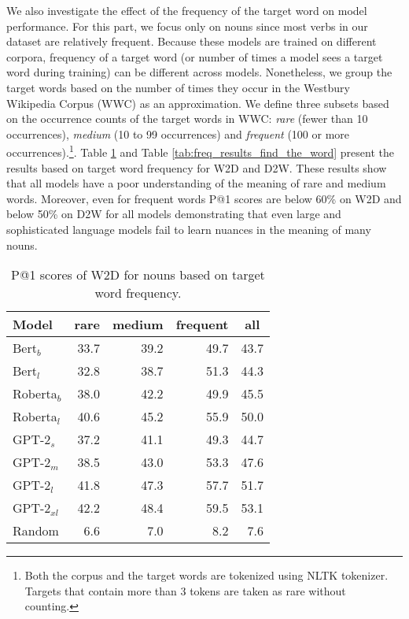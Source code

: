 \documentclass[11pt,a4paper]{article}
\begin{document}
We also investigate the effect of the frequency of the
target word on model performance. For this part, we
focus only on  nouns since most  verbs in our dataset
are relatively frequent. Because these models are trained on
different corpora, frequency of a target word (or number of
times a model sees a target word during training) can be
different across  models. Nonetheless, we group the
target words based on the number of times they occur in the
Westbury Wikipedia Corpus (WWC) \cite{WWC} as an
approximation. We
define three subsets based on the occurrence counts of the
target words in WWC: \textit{rare} (fewer than 10 occurrences),
 \textit{medium} (10 to 99 occurrences) and
 \textit{frequent}
(100 or more occurrences).\footnote{Both the corpus and
  the target words are tokenized using NLTK tokenizer.  Targets
  that contain more than 3 tokens are taken as rare without
  counting.}. Table
\ref{tab:freq_results_find_the_definition} and Table
\ref{tab:freq_results_find_the_word} present the  results
based on target word frequency for
W2D and D2W.
These results show that
all models have a poor understanding of the meaning of 
rare and medium words. Moreover, even for 
frequent words P@1 scores are below 60\% on W2D and below 50\% on D2W for all models demonstrating that even  large and sophisticated language
models fail to learn nuances in the meaning of many
nouns.

\begin{table}
    \centering
    \begin{tabular}{l|rrrr}
    \hline
         \textbf{Model} & \multicolumn{1}{c}{\textbf{rare}} & \multicolumn{1}{c}{\textbf{medium}} & \multicolumn{1}{c}{\textbf{frequent}} & \multicolumn{1}{c}{\textbf{all}} \\ \hline
     Bert$_{b}$ & 33.7 & 39.2 & 49.7 & 43.7 \\
     Bert$_{l}$ & 32.8 & 38.7 & 51.3 & 44.3 \\
     Roberta$_{b}$ & 38.0 & 42.2 & 49.9 & 45.5 \\
     Roberta$_{l}$ & 40.6 & 45.2 & 55.9 & 50.0 \\ \hline
     GPT-2$_{s}$ & 37.2 & 41.1 & 49.3 & 44.7 \\
     GPT-2$_{m}$ & 38.5 & 43.0 & 53.3 & 47.6 \\
     GPT-2$_{l}$ & 41.8 & 47.3 & 57.7 & 51.7 \\
     GPT-2$_{xl}$ & 42.2 & 48.4 & 59.5 & 53.1 \\ \hline
     Random & 6.6 & 7.0 & 8.2 & 7.6 \\ \hline 
     
    \end{tabular}
    \caption{P@1 scores of W2D for nouns based on target word frequency.}
    \label{tab:freq_results_find_the_definition}
\end{table}
\end{document}
